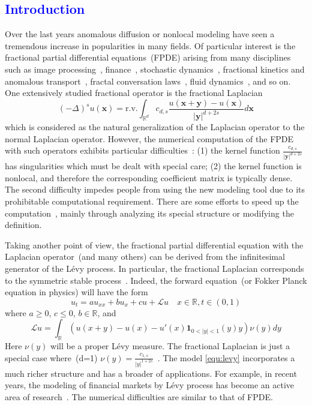 \documentclass[3p,,preprint,12pt]{elsarticle}
\newcommand{\RR}[0]{\mathbb{R}}
\newcommand{\bx}[0]{\mathbf{x}}
\newcommand{\lib}[1]{\textcolor{blue}{\section{#1}}}
\theoremstyle{definition}
\newcommand{\by}[0]{\mathbf{y}}
\begin{document}
\lib{Introduction}
Over the last years anomalous diffusion or nonlocal modeling have seen a tremendous increase in popularities in many fields. Of particular interest is the fractional partial differential equations~(FPDE) arising from many disciplines such as image processing~\cite{gatto2015numerical,unser2009multiresolution}, finance~\cite{scalas2000fractional}, stochastic dynamics~\cite{bogdan2003censored}, fractional kinetics and anomalous transport~\cite{zaslavsky2002chaos}, fractal conversation laws~\cite{alibaud2012continuous}, fluid dynamics~\cite{chen2010anomalous,chen2006speculative,epps2018turbulence}, and so on. One extensively studied fractional operator is the fractional Laplacian~\cite{lischke2018fractional}
\begin{equation}
	(-\Delta)^s u(\bx)=\mathrm{r.v.}\int_{\RR^d} c_{d,s}\frac{u(\bx+\by)-u(\bx)}{|\by|^{d+2s}}d\bx
\end{equation}
which is considered as the natural generalization of the Laplacian operator to the normal Laplacian operator. However, the numerical computation of the FPDE with such operators exhibits particular difficulties~\cite{bonito2018numerical,huang2016finite}: (1) the kernel function $\frac{c_{d,s}}{|\by|^{d+2s}}$ has singularities which must be dealt with special care; (2) the kernel function is nonlocal, and therefore the corresponding coefficient matrix is typically dense. The second difficulty impedes people from using the new modeling tool due to its prohibitable computational requirement. There are some efforts to speed up the computation~\cite{meidner2017hp,kyprianou2017unbiased,acosta2018regularity,zhao2017adaptive}, mainly through analyzing its special structure or modifying the definition. 

Taking another point of view, the fractional partial differential equation with the Laplacian operator~(and many others) can be derived from the infinitesimal generator of the L\'evy process. In particular, the fractional Laplacian corresponds to the symmetric stable process~\cite{garbaczewski2018fractional}. Indeed, the forward equation~(or Fokker Planck equation in physics) will have the form~\cite{barndorff2012levy}
\begin{equation}\label{equ:levy}
	u_t = a u_{xx} + bu_x + cu + \mathcal{L}u\quad x\in \RR, t\in (0,1)
\end{equation}
where $a\geq 0$, $c\leq 0$, $b\in\RR$, and
\begin{equation}
	\mathcal{L}u = \int_\RR (u(x+y)-u(x)-u'(x)\mathbf{1}_{0<|y|<1}(y)y)\nu(y)dy
\end{equation}  
Here $\nu(y)$ will be a proper L\'evy measure. The fractional Laplacian is just a special case where~(d=1) $\nu(y) = \frac{c_{1,s}}{|y|^{1+2s}}$~\cite{kwasnicki2017ten}. The model \cref{equ:levy} incorporates a much richer structure and has a broader of applications. For example, in recent years, the modeling of financial markets by L\'evy process has become an active area of research~\cite{MichaelC25:online}. The numerical difficulties are similar to that of FPDE. 
\end{document}

